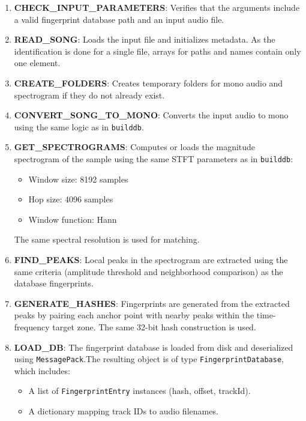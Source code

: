 \documentclass[11pt, a4paper]{article}
\begin{document}
    \begin{enumerate}
        \item \textbf{CHECK\_INPUT\_PARAMETERS}: Verifies that the arguments include a valid fingerprint database path and an input audio file.
        \item \textbf{READ\_SONG}: Loads the input file and initializes metadata. As the identification is done for a single file, arrays for paths and names contain only one element.
        \item \textbf{CREATE\_FOLDERS}: Creates temporary folders for mono audio and spectrogram if they do not already exist.
        \item \textbf{CONVERT\_SONG\_TO\_MONO}: Converts the input audio to mono using the same logic as in \texttt{builddb}.
        \item \textbf{GET\_SPECTROGRAMS}: Computes or loads the magnitude spectrogram of the sample using the same STFT parameters as in \texttt{builddb}:
        \begin{itemize}
            \item Window size: 8192 samples
            \item Hop size: 4096 samples
            \item Window function: Hann
        \end{itemize}
        The same spectral resolution is used for matching.
        \item \textbf{FIND\_PEAKS}: Local peaks in the spectrogram are extracted using the same criteria (amplitude threshold and neighborhood comparison) as the database fingerprints.
        \item \textbf{GENERATE\_HASHES}: Fingerprints are generated from the extracted peaks by pairing each anchor point with nearby peaks within the time-frequency target zone. The same 32-bit hash 
        construction is used.
        \item \textbf{LOAD\_DB}: The fingerprint database is loaded from disk and deserialized using \newline \texttt{MessagePack}.The resulting object is of type \texttt{FingerprintDatabase}, which includes:
        \begin{itemize}
            \item A list of \texttt{FingerprintEntry} instances (hash, offset, trackId).
            \item A dictionary mapping track IDs to audio filenames.
        \end{itemize}
        \begin{figure}[H]

\end{figure}
\end{enumerate}
\end{document}
